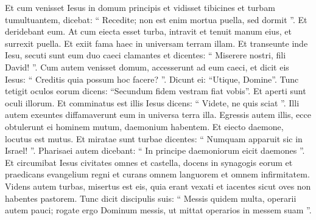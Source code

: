 \begin{biblechapter}
\begin{biblechapter}
\begin{biblechapter}
\begin{biblechapter}
\begin{biblechapter}
\begin{biblechapter}
\begin{biblechapter}
\begin{biblechapter}
\begin{biblechapter}
 \verse Et cum venisset Iesus in domum principis et vidisset tibicines et turbam tumultuantem, 
\verse dicebat: “ Recedite; non est enim mortua puella, sed dormit ”. Et deridebant eum. 
\verse At cum eiecta esset turba, intravit et tenuit manum eius, et surrexit puella. 
\verse Et exiit fama haec in universam terram illam.
 \verse Et transeunte inde Iesu, secuti sunt eum duo caeci clamantes et dicentes: “ Miserere nostri, fili David! ”. 
\verse Cum autem venisset domum, accesserunt ad eum caeci, et dicit eis Iesus: “ Creditis quia possum hoc facere? ”. Dicunt ei: “Utique, Domine”. 
\verse Tunc tetigit oculos eorum dicens: “Secundum fidem vestram fiat vobis”. 
\verse Et aperti sunt oculi illorum. Et comminatus est illis Iesus dicens: “ Videte, ne quis sciat ”. 
\verse Illi autem exeuntes diffamaverunt eum in universa terra illa.
 \verse Egressis autem illis, ecce obtulerunt ei hominem mutum, daemonium habentem. 
\verse Et eiecto daemone, locutus est mutus. Et miratae sunt turbae dicentes: “ Numquam apparuit sic in Israel! ”. 
\verse Pharisaei autem dicebant: “ In principe daemoniorum eicit daemones ”.
 \verse Et circumibat Iesus civitates omnes et castella, docens in synagogis eorum et praedicans evangelium regni et curans omnem languorem et omnem infirmitatem. 
 \verse Videns autem turbas, misertus est eis, quia erant vexati et iacentes sicut oves non habentes pastorem. 
\verse Tunc dicit discipulis suis: “ Messis quidem multa, operarii autem pauci; 
\verse rogate ergo Dominum messis, ut mittat operarios in messem suam ”.
 

\end{biblechapter}
\end{biblechapter}
\end{biblechapter}
\end{biblechapter}
\end{biblechapter}
\end{biblechapter}
\end{biblechapter}
\end{biblechapter}
\end{biblechapter}
